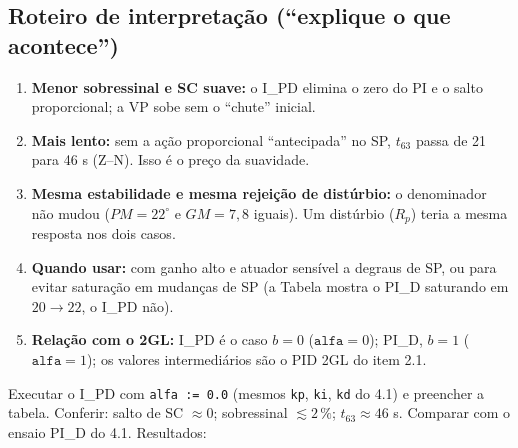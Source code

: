\subsection{Roteiro de interpretação (``explique o que acontece'')}
\begin{enumerate}
\item \textbf{Menor sobressinal e SC suave:} o I\_PD elimina o zero do PI e o salto proporcional; a VP sobe sem o ``chute'' inicial.
\item \textbf{Mais lento:} sem a ação proporcional ``antecipada'' no SP, $t_{63}$ passa de 21 para 46 s (Z--N). Isso é o preço da suavidade.
\item \textbf{Mesma estabilidade e mesma rejeição de distúrbio:} o denominador não mudou ($PM=22^\circ$ e $GM=7{,}8$ iguais). Um distúrbio ($R_p$) teria a mesma resposta nos dois casos.
\item \textbf{Quando usar:} com ganho alto e atuador sensível a degraus de SP, ou para evitar saturação em mudanças de SP (a Tabela mostra o PI\_D saturando em $20\to22$, o I\_PD não).
\item \textbf{Relação com o 2GL:} I\_PD é o caso $b=0$ ($\mathtt{alfa}=0$); PI\_D, $b=1$ ($\mathtt{alfa}=1$); os valores intermediários são o PID 2GL do item 2.1.
\end{enumerate}
\begin{todo}Executar o I\_PD com \texttt{alfa := 0.0} (mesmos \texttt{kp}, \texttt{ki}, \texttt{kd} do 4.1) e preencher a tabela. Conferir: salto de SC $\approx0$; sobressinal $\lesssim2\,\%$; $t_{63}\approx46$ s. Comparar com o ensaio PI\_D do 4.1. Resultados: \underline{\hspace{6cm}}\end{todo}

